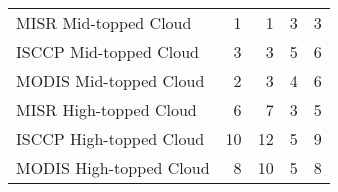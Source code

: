 \begin{tabular}{lrrrr}
   MISR Mid-topped Cloud &                        1 &                        1 &                        3 &                        3 \\
  ISCCP Mid-topped Cloud &                        3 &                        3 &                        5 &                        6 \\
  MODIS Mid-topped Cloud &                        2 &                        3 &                        4 &                        6 \\
  MISR High-topped Cloud &                        6 &                        7 &                        3 &                        5 \\
 ISCCP High-topped Cloud &                       10 &                       12 &                        5 &                        9 \\
 MODIS High-topped Cloud &                        8 &                       10 &                        5 &                        8 \\ \hline
\end{tabular}
